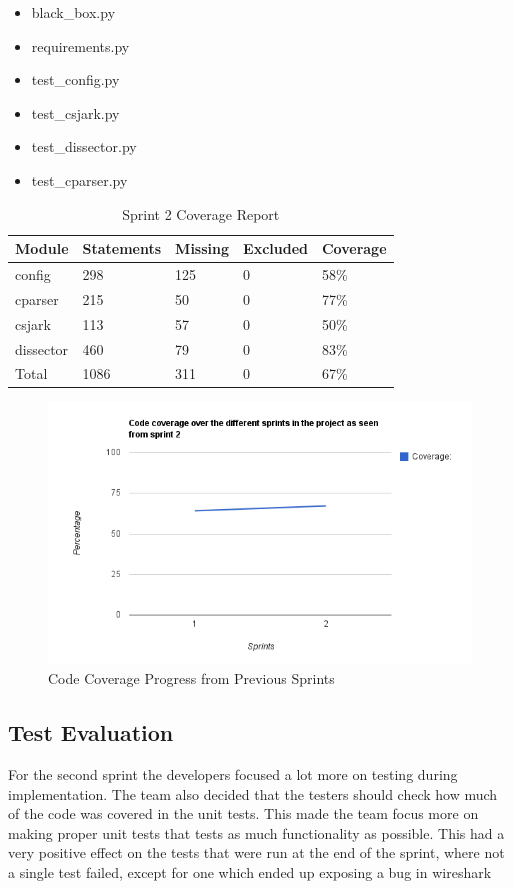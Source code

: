 \begin{itemize}
\item black\_box.py
\item requirements.py
\item test\_config.py
\item test\_csjark.py
\item test\_\gls{dissector}.py
\item test\_cparser.py
\end {itemize}

\begin{table}[!htb]\footnotesize\center
	\caption{Sprint 2 Coverage Report\label{tab:sp2CoverageReport}}
	\begin{tabular}{l l l l l}
		\toprule
		Module & Statements & Missing & Excluded & Coverage\\
		\midrule
		config & 298 & 125 & 0 & 58\%\ \\
		cparser & 215 & 50 & 0 & 77\%\ \\
		csjark & 113 & 57 & 0 & 50\%\ \\
		\gls{dissector} & 460 & 79 & 0 & 83\%\ \\
		Total & 1086 & 311 & 0 & 67\%\ \\
		\bottomrule
	\end{tabular}
\end{table}

\begin{figure}[ht]
	\center
	\includegraphics[width=\textwidth]{./sprints/img/sprint2_code_coverage_chart}
	\caption{Code Coverage Progress from Previous Sprints\label{fig:sp2CoverageChart}}
\end{figure}

\subsection{Test Evaluation}
For the second sprint the developers focused a lot more on testing during implementation. The team also decided that the testers should check how much of the code was covered in the unit tests. This made the team focus more on making proper unit tests that tests as much functionality as possible. This had a very positive effect on the tests that were run at the end of the sprint, where not a single test failed, except for one which ended up exposing a bug in \Gls{wireshark}


